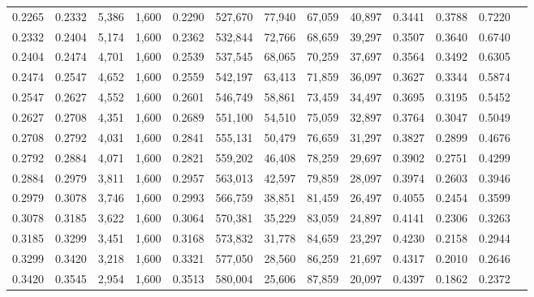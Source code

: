 \begin{tabular}{rrrrrrrrrrrrr}
0.2265 & 0.2332 &  5,386 & 1,600 &                                     0.2290 & 527,670 &  77,940 &  67,059 &  40,897 & 0.3441 & 0.3788 & 0.7220 \\
0.2332 & 0.2404 &  5,174 & 1,600 &                                     0.2362 & 532,844 &  72,766 &  68,659 &  39,297 & 0.3507 & 0.3640 & 0.6740 \\
0.2404 & 0.2474 &  4,701 & 1,600 &                                     0.2539 & 537,545 &  68,065 &  70,259 &  37,697 & 0.3564 & 0.3492 & 0.6305 \\
0.2474 & 0.2547 &  4,652 & 1,600 &                                     0.2559 & 542,197 &  63,413 &  71,859 &  36,097 & 0.3627 & 0.3344 & 0.5874 \\
0.2547 & 0.2627 &  4,552 & 1,600 &                                     0.2601 & 546,749 &  58,861 &  73,459 &  34,497 & 0.3695 & 0.3195 & 0.5452 \\
0.2627 & 0.2708 &  4,351 & 1,600 &                                     0.2689 & 551,100 &  54,510 &  75,059 &  32,897 & 0.3764 & 0.3047 & 0.5049 \\
0.2708 & 0.2792 &  4,031 & 1,600 &                                     0.2841 & 555,131 &  50,479 &  76,659 &  31,297 & 0.3827 & 0.2899 & 0.4676 \\
0.2792 & 0.2884 &  4,071 & 1,600 &                                     0.2821 & 559,202 &  46,408 &  78,259 &  29,697 & 0.3902 & 0.2751 & 0.4299 \\
0.2884 & 0.2979 &  3,811 & 1,600 &                                     0.2957 & 563,013 &  42,597 &  79,859 &  28,097 & 0.3974 & 0.2603 & 0.3946 \\
0.2979 & 0.3078 &  3,746 & 1,600 &                                     0.2993 & 566,759 &  38,851 &  81,459 &  26,497 & 0.4055 & 0.2454 & 0.3599 \\
0.3078 & 0.3185 &  3,622 & 1,600 &                                     0.3064 & 570,381 &  35,229 &  83,059 &  24,897 & 0.4141 & 0.2306 & 0.3263 \\
0.3185 & 0.3299 &  3,451 & 1,600 &                                     0.3168 & 573,832 &  31,778 &  84,659 &  23,297 & 0.4230 & 0.2158 & 0.2944 \\
0.3299 & 0.3420 &  3,218 & 1,600 &                                     0.3321 & 577,050 &  28,560 &  86,259 &  21,697 & 0.4317 & 0.2010 & 0.2646 \\
0.3420 & 0.3545 &  2,954 & 1,600 &                                     0.3513 & 580,004 &  25,606 &  87,859 &  20,097 & 0.4397 & 0.1862 & 0.2372 \\

\end{tabular}
